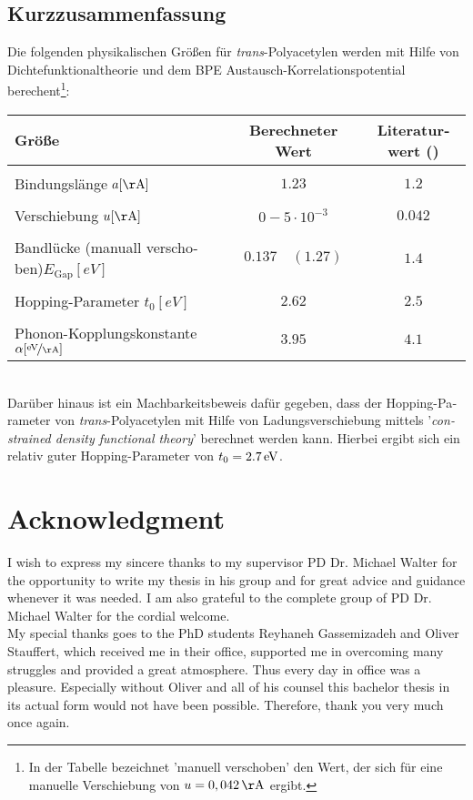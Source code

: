 \begin{otherlanguage}{german}
\chapter*{Kurzzusammenfassung}
	Die folgenden physikalischen Größen für \emph{trans}-Polyacetylen werden mit Hilfe von Dichtefunktionaltheorie und dem BPE Austausch-Korrelationspotential berechent\footnote{In der Tabelle bezeichnet 'manuell verschoben' den Wert, der sich für eine manuelle Verschiebung von \linebreak $u = \unit[0,042]{\AA}$ ergibt.}:
	\begin{table}[!h]
		\centering
		\begin{tabular}{l|c|c}
			Größe & Berechneter Wert & Literaturwert (\cite{PhysRevLett.42.1698, doi:10.1021/cr990357p})\\
			\hline \hline
			&&\\[-.3cm]
			Bindungslänge \hfill$a [\unit{\AA}]$ & $1.23$ & $1.2$\\ \hline&&\\[-.3cm]
			Verschiebung \hfill$u [\unit{\AA}]$& $0 - 5\cdot10^{-3}$ & $0.042$\\ \hline&&\\[-.3cm]
			Bandlücke (manuall verschoben)\hfill$E_\text{Gap} [\unit{eV}]$ & $0.137\quad(1.27)$ & $1.4$\\ \hline &&\\[-.3cm]
			Hopping-Parameter \hfill$t_0 [\unit{eV}]$ & $2.62$ & $2.5$ \\ \hline&&\\[-.3cm]
			Phonon-Kopplungskonstante \hspace*{2cm}$\alpha [\unitfrac{eV}{\AA}]$& $3.95$ & $4.1$
		\end{tabular}
	\end{table}\\
	Darüber hinaus ist ein Machbarkeitsbeweis dafür gegeben, dass der Hopping-Parameter von \emph{trans}-Polyacetylen mit Hilfe von Ladungsverschiebung mittels '\foreignlanguage{english}{\emph{constrained density functional theory}}' berechnet werden kann. Hierbei ergibt sich ein relativ guter Hopping-Parameter von $t_0 = \unit[2.7]{eV}$.
\end{otherlanguage}

\chapter*{Acknowledgment}

I wish to express my sincere thanks to my supervisor PD Dr. Michael Walter for the opportunity to write my thesis in his group and for great advice and guidance whenever it was needed. I am also grateful to the complete group of PD Dr. Michael Walter for the cordial welcome.\\
My special thanks goes to the PhD students Reyhaneh Gassemizadeh and Oliver Stauffert, which received me in their office, supported me in overcoming many struggles and provided a great atmosphere. Thus every day in office was a pleasure. Especially without Oliver and all of his counsel this bachelor thesis in its actual form would not have been possible. Therefore, thank you very much once again.
